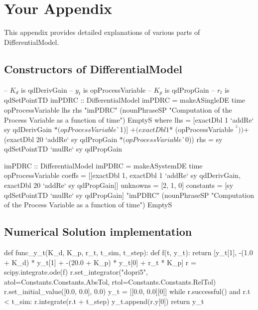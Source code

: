 \chapter{Your Appendix}
\label{appendix_a}

This appendix provides detailed explanations of various parts of DifferentialModel.

\section{Constructors of DifferentialModel}

\begin{listing}
\begin{haskell1}
-- $K_d$ is qdDerivGain
-- $y_t$ is opProcessVariable
-- $K_p$ is qdPropGain
-- $r_t$ is qdSetPointTD
imPDRC :: DifferentialModel
imPDRC = makeASingleDE
	time
	opProcessVariable
	lhs
	rhs
	"imPDRC"
	(nounPhraseSP "Computation of the Process Variable as a function of time")
	EmptyS
	where 
	lhs = [exactDbl 1 `addRe` sy qdDerivGain $* (opProcessVariable $^^ 1)]
	$+ (exactDbl 1 $* (opProcessVariable $^^ 2))
	$+ (exactDbl 20 `addRe` sy qdPropGain $* (opProcessVariable $^^ 0))
	rhs = sy qdSetPointTD `mulRe` sy qdPropGain
\end{haskell1}
\label{code_scexinputl}
\end{listing}

\begin{listing}
\begin{haskell1}
imPDRC :: DifferentialModel
imPDRC = makeASystemDE
	time
	opProcessVariable
	coeffs = [[exactDbl 1, exactDbl 1 `addRe` sy qdDerivGain, exactDbl 20 `addRe` sy qdPropGain]]
	unknowns = [2, 1, 0]
	constants = [sy qdSetPointTD `mulRe` sy qdPropGain]
	"imPDRC"
	(nounPhraseSP "Computation of the Process Variable as a function of time")
	EmptyS
\end{haskell1}
\label{code_scexmatrix}
\end{listing}

\section{Numerical Solution implementation}

\begin{listing}
\begin{python1}
def func_y_t(K_d, K_p, r_t, t_sim, t_step):
	def f(t, y_t):
		return [y_t[1], -(1.0 + K_d) * y_t[1] + -(20.0 + K_p) * y_t[0] + r_t * K_p]
	r = scipy.integrate.ode(f)
	r.set_integrator("dopri5", atol=Constants.Constants.AbsTol, rtol=Constants.Constants.RelTol)
	r.set_initial_value([0.0, 0.0], 0.0)
	y_t = [[0.0, 0.0][0]]
	while r.successful() and r.t < t_sim:
		r.integrate(r.t + t_step)
		y_t.append(r.y[0])
	return y_t
\end{python1}
\label{code_pythonscipy}
\end{listing}


